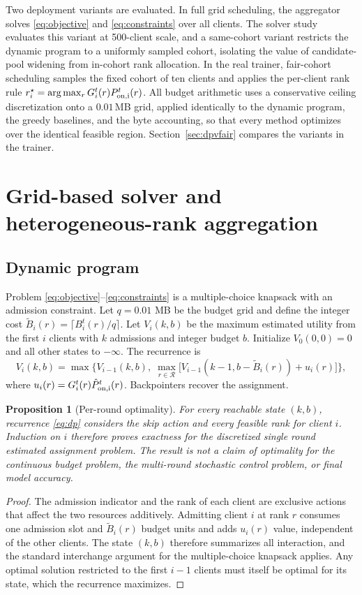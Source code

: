 \documentclass[preprint,12pt]{elsarticle}
\newtheorem{proposition}{Proposition}
\begin{document}
Two deployment variants are evaluated. In full grid scheduling, the aggregator solves \eqref{eq:objective} and \eqref{eq:constraints} over all clients. The solver study evaluates this variant at 500-client scale, and a same-cohort variant restricts the dynamic program to a uniformly sampled cohort, isolating the value of candidate-pool widening from in-cohort rank allocation. In the real trainer, fair-cohort scheduling samples the fixed cohort of ten clients and applies the per-client rank rule $r_i^\star=\arg\max_r G_i^t(r)P_{\rm on,i}^t(r)$. All budget arithmetic uses a conservative ceiling discretization onto a $0.01$\,MB grid, applied identically to the dynamic program, the greedy baselines, and the byte accounting, so that every method optimizes over the identical feasible region. Section~\ref{sec:dpvfair} compares the variants in the trainer.

\section{Grid-based solver and heterogeneous-rank aggregation}
\label{sec:solver}

\subsection{Dynamic program}
Problem \eqref{eq:objective}--\eqref{eq:constraints} is a multiple-choice knapsack with an admission constraint. Let $q=0.01$ MB be the budget grid and define the integer cost $\widetilde B_i(r)=\lceil B_i^t(r)/q\rceil$. Let $V_i(k,b)$ be the maximum estimated utility from the first $i$ clients with $k$ admissions and integer budget $b$. Initialize $V_0(0,0)=0$ and all other states to $-\infty$. The recurrence is
\begin{equation}
V_i(k,b)=\max\Big\{V_{i-1}(k,b),\;\max_{r\in\mathcal R}\big[V_{i-1}(k-1,b-\widetilde B_i(r))+u_i(r)\big]\Big\},
\label{eq:dp}
\end{equation}
where $u_i(r)=G_i^t(r)\hat P_{\rm on,i}^t(r)$. Backpointers recover the assignment.

\begin{proposition}[Per-round optimality]
For every reachable state $(k,b)$, recurrence \eqref{eq:dp} considers the skip action and every feasible rank for client $i$. Induction on $i$ therefore proves exactness for the discretized single round estimated assignment problem. The result is not a claim of optimality for the continuous budget problem, the multi-round stochastic control problem, or final model accuracy.
\end{proposition}
\begin{proof}
The admission indicator and the rank of each client are exclusive actions that affect the two resources additively. Admitting client $i$ at rank $r$ consumes one admission slot and $\widetilde B_i(r)$ budget units and adds $u_i(r)$ value, independent of the other clients. The state $(k,b)$ therefore summarizes all interaction, and the standard interchange argument for the multiple-choice knapsack applies. Any optimal solution restricted to the first $i-1$ clients must itself be optimal for its state, which the recurrence maximizes.
\end{proof}
\end{document}

